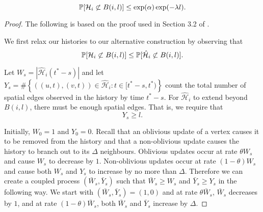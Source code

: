 \begin{lemma}
	\label{lem:history escaping ball bound}
	\begin{equation}
		\mathbb{P}[\mathcal{H}_{i} \not\subset B(i, l)] \leq \exp(\alpha) \exp(-\lambda l).
	\end{equation}
\end{lemma}
\begin{proof}
The following is based on the proof used in Section 3.2 of \cite{Lubetzky2014-po}.

We first relax our histories to our alternative construction by observing that
\begin{equation}
	\mathbb{P}[\mathcal{H}_{i} \not\subset B(i, l)] \leq \mathbb{P}[\hat{\mathcal{H}}_{i} \not\subset B(i, l)].
\end{equation}

Let $W_s = |\hat{\mathcal{H}}_i (t^* - s)|$ and let $Y_s = \#\left\{ \left( (u,t), (v,t) \right) \in \hat{\mathcal{H}}_i: t \in [t^* - s, t^*) \right\}$ count the total number of spatial edges observed in the history by time $t^* - s$. For $\hat{\mathcal{H}}_i$ to extend beyond $B(i, l)$, there must be enough spatial edges. That is, we require that
\begin{equation}
	Y_s \geq l.
\end{equation}

Initially, $W_0 = 1$ and $Y_0 = 0$. Recall that an oblivious update of a vertex causes it to be removed from the history and that a non-oblivious update causes the history to branch out to its $\Delta$ neighbours. Oblivious updates occur at rate $\theta W_s$ and cause $W_s$ to decrease by $1$. Non-oblivious updates occur at rate $(1 - \theta)W_s$ and cause both $W_s$ and $Y_s$ to increase by no more than $\Delta$. Therefore we can create a coupled process $(\bar{W}_s, \bar{Y}_s)$ such that $\bar{W}_s \geq W_s$ and $\bar{Y}_s \geq Y_s$ in the following way. We start with $(\bar{W}_s, \bar{Y}_s) = (1, 0)$ and at rate $\theta \bar{W}_s$, $\bar{W}_s$ decreases by $1$, and at rate $(1 - \theta)\bar{W}_s$, both $\bar{W}_s$ and $\bar{Y}_s$ increase by $\Delta$.


\end{proof}
